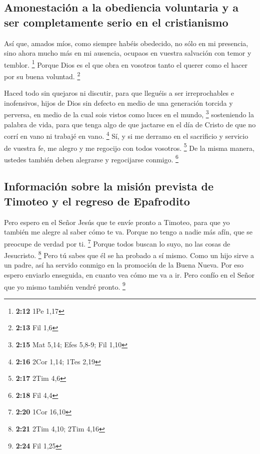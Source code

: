 \begin{paracol}{2}
\hypertarget{amonestaciuxf3n-a-la-obediencia-voluntaria-y-a-ser-completamente-serio-en-el-cristianismo}{%
\subsection{Amonestación a la obediencia voluntaria y a ser
completamente serio en el
cristianismo}\label{amonestaciuxf3n-a-la-obediencia-voluntaria-y-a-ser-completamente-serio-en-el-cristianismo}}

 Así que, amados míos, como siempre habéis obedecido, no
sólo en mi presencia, sino ahora mucho más en mi ausencia, ocupaos en
vuestra salvación con temor y temblor. \footnote{\textbf{2:12} 1Pe 1,17}
 Porque Dios es el que obra en vosotros tanto el querer
como el hacer por su buena voluntad. \footnote{\textbf{2:13} Fil 1,6}

 Haced todo sin quejaros ni discutir, 
para que lleguéis a ser irreprochables e inofensivos, hijos de Dios sin
defecto en medio de una generación torcida y perversa, en medio de la
cual sois vistos como luces en el mundo, \footnote{\textbf{2:15} Mat
  5,14; Efes 5,8-9; Fil 1,10}  sosteniendo la palabra de
vida, para que tenga algo de que jactarse en el día de Cristo de que no
corrí en vano ni trabajé en vano. \footnote{\textbf{2:16} 2Cor 1,14;
  1Tes 2,19}  Sí, y si me derramo en el sacrificio y
servicio de vuestra fe, me alegro y me regocijo con todos vosotros.
\footnote{\textbf{2:17} 2Tim 4,6}  De la misma manera,
ustedes también deben alegrarse y regocijarse conmigo. \footnote{\textbf{2:18}
  Fil 4,4}

\hypertarget{informaciuxf3n-sobre-la-misiuxf3n-prevista-de-timoteo-y-el-regreso-de-epafrodito}{%
\subsection{Información sobre la misión prevista de Timoteo y el regreso
de
Epafrodito}\label{informaciuxf3n-sobre-la-misiuxf3n-prevista-de-timoteo-y-el-regreso-de-epafrodito}}

 Pero espero en el Señor Jesús que te envíe pronto a
Timoteo, para que yo también me alegre al saber cómo te va.
 Porque no tengo a nadie más afín, que se preocupe de
verdad por ti. \footnote{\textbf{2:20} 1Cor 16,10} 
Porque todos buscan lo suyo, no las cosas de Jesucristo. \footnote{\textbf{2:21}
  2Tim 4,10; 2Tim 4,16}  Pero tú sabes que él se ha
probado a sí mismo. Como un hijo sirve a un padre, así ha servido
conmigo en la promoción de la Buena Nueva.  Por eso
espero enviarlo enseguida, en cuanto vea cómo me va a ir.
 Pero confío en el Señor que yo mismo también vendré
pronto. \footnote{\textbf{2:24} Fil 1,25}


\end{paracol}
